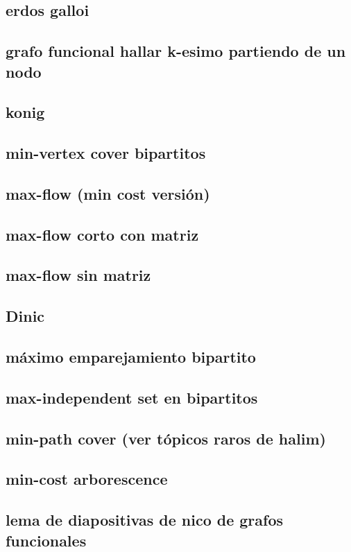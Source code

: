 \subsection{erdos galloi}
\subsection{grafo funcional hallar k-esimo partiendo de un nodo}
\subsection{konig}
\subsection{min-vertex cover bipartitos}
\subsection{max-flow (min cost versión)}
\subsection{max-flow corto con matriz}
\subsection{max-flow sin matriz}
\subsection{Dinic}
\subsection{máximo emparejamiento bipartito}
\subsection{max-independent set en bipartitos}
\subsection{min-path cover (ver tópicos raros de halim)}
\subsection{min-cost arborescence}
\subsection{lema de diapositivas de nico de grafos funcionales }
